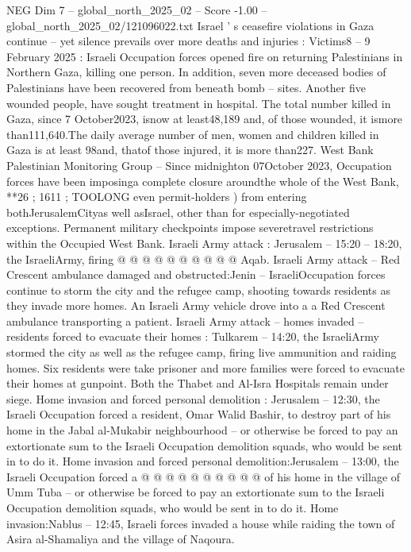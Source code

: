 \begin{textsample}{NEG Dim 7 – global\_north\_2025\_02 – Score -1.00 – global\_north\_2025\_02/121096022.txt}  \label{ex:f7_neg_170}
Israel ' s ceasefire violations in Gaza continue -- yet silence prevails over more deaths and injuries : Victims8 -- 9 February 2025 : Israeli Occupation forces opened fire on returning Palestinians in Northern Gaza, killing one person.
In addition, seven more deceased bodies of Palestinians have been recovered from beneath bomb -- sites.
Another five wounded people, have sought treatment in hospital.
The total number killed in Gaza, since 7 October2023, isnow at least48,189 and, of those wounded, it ismore than111,640.The daily average number of men, women and children killed in Gaza is at least 98and, thatof those injured, it is more than227.
West Bank Palestinian Monitoring Group -- Since midnighton 07October 2023, Occupation forces have been imposinga complete closure aroundthe whole of the West Bank, **26 ; 1611 ; TOOLONG even permit-holders ) from entering bothJerusalemCityas well asIsrael, other than for especially-negotiated exceptions.
Permanent military checkpoints impose severetravel restrictions within the Occupied West Bank.
Israeli Army attack : Jerusalem -- 15:20 -- 18:20, the IsraeliArmy, firing @ @ @ @ @ @ @ @ @ @ Aqab.
Israeli Army attack -- Red Crescent ambulance damaged and obstructed:Jenin -- IsraeliOccupation forces continue to storm the city and the refugee camp, shooting towards residents as they invade more homes.
An Israeli Army vehicle drove into a a Red Crescent ambulance transporting a patient.
Israeli Army attack -- homes invaded -- residents forced to evacuate their homes : Tulkarem -- 14:20, the IsraeliArmy stormed the city as well as the refugee camp, firing live ammunition and raiding homes.
Six residents were take prisoner and more families were forced to evacuate their homes at gunpoint.
Both the Thabet and Al-Isra Hospitals remain under siege.
Home invasion and forced personal demolition : Jerusalem -- 12:30, the Israeli Occupation forced a resident, Omar Walid Bashir, to destroy part of his home in the Jabal al-Mukabir neighbourhood -- or otherwise be forced to pay an extortionate sum to the Israeli Occupation demolition squads, who would be sent in to do it.
Home invasion and forced personal demolition:Jerusalem -- 13:00, the Israeli Occupation forced a @ @ @ @ @ @ @ @ @ @ of his home in the village of Umm Tuba -- or otherwise be forced to pay an extortionate sum to the Israeli Occupation demolition squads, who would be sent in to do it.
Home invasion:Nablus -- 12:45, Israeli forces invaded a house while raiding the town of Asira al-Shamaliya and the village of Naqoura.

\end{textsample}
